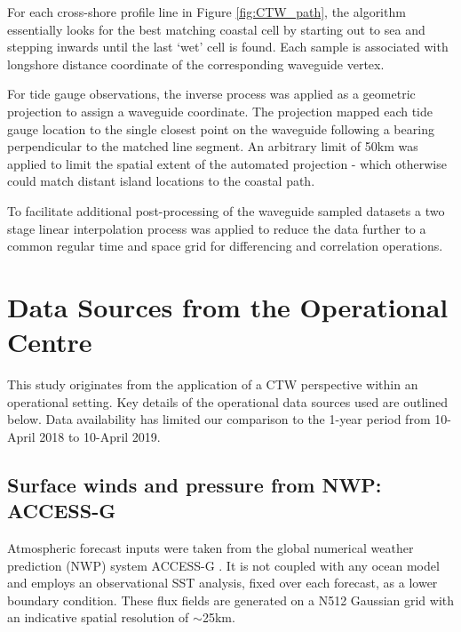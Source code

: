 For each cross-shore profile line in Figure \ref{fig:CTW_path}, the algorithm essentially looks for the best matching coastal cell by starting out to sea and stepping inwards until the last `wet' cell is found.
Each sample is associated with longshore distance coordinate of the corresponding waveguide vertex.

For tide gauge observations, the inverse process was applied as a geometric projection to assign a waveguide coordinate. 
The projection mapped each tide gauge location to the single closest point on the waveguide following a bearing perpendicular to the matched line segment. 
An arbitrary limit of 50km was applied to limit the spatial extent of the automated projection - which otherwise could match distant island locations to the coastal path. 

To facilitate additional post-processing of the waveguide sampled datasets a two stage linear interpolation process was applied to reduce the data further to a common regular time and space grid for differencing and correlation operations.  

\section{Data Sources from the Operational Centre}

This study originates from the application of a CTW perspective within an operational setting.
Key details of the operational data sources used are outlined below.
Data availability has limited our comparison to the 1-year period from 10-April 2018 to 10-April 2019.

\subsection{Surface winds and pressure from NWP: ACCESS-G }
\label{sec:access}
Atmospheric forecast inputs were taken from the global numerical weather prediction (NWP) system ACCESS-G \citep{BureauofMeterology:C8IaJ2Qq}.
It is not coupled with any ocean model and employs an observational SST analysis, fixed over each forecast, as a lower boundary condition.
These flux fields are generated on a N512 Gaussian grid with an indicative spatial resolution of $\sim$25km. 

